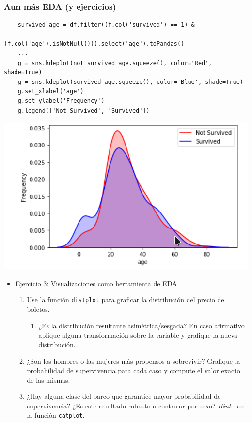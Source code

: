 \documentclass[leqno, 10pt, envcountsect]{beamer}
\numberwithin{equation}{section}
\theoremstyle{definition}
\theoremstyle{example}
\numberwithin{figure}{section}
\numberwithin{table}{section}
\let\olditem\item
\renewcommand{\item}{%
\olditem\vspace{1pt}}
\begin{document}
\begin{frame}[fragile]
  \frametitle{Aun más EDA (y ejercicios)}
    \begin{verbatim}
    survived_age = df.filter((f.col('survived') == 1) &
                   (f.col('age').isNotNull())).select('age').toPandas()
    ...
    g = sns.kdeplot(not_survived_age.squeeze(), color='Red', shade=True)
    g = sns.kdeplot(survived_age.squeeze(), color='Blue', shade=True)
    g.set_xlabel('age')
    g.set_ylabel('Frequency')
    g.legend(['Not Survived', 'Survived'])
    \end{verbatim}
    \begin{center}
      \includegraphics[scale=0.12]{kde.png}
    \end{center}
  \begin{itemize}
    \item Ejercicio 3: Visualizaciones como herramienta de EDA
      \begin{enumerate}
        \item Use la función \texttt{distplot} para graficar la distribución del
          precio de boletos.
          \begin{enumerate}
            \item ¿Es la distribución resultante asimétrica/sesgada? En caso
              afirmativo aplique alguna transformación sobre la variable y
              grafique la nueva distribución.
          \end{enumerate}
        \item ¿Son los hombres o las mujeres más propensos a sobrevivir?
          Grafique la probabilidad de supervivencia para cada caso y compute el
          valor exacto de las mismas.
        \item ¿Hay alguna clase del barco que garantice mayor probabilidad de
          supervivencia? ¿Es este resultado robusto a controlar por sexo?
          \textit{Hint}: use la función \texttt{catplot}.
      \end{enumerate}
  \end{itemize}
\end{frame}
\end{document}
